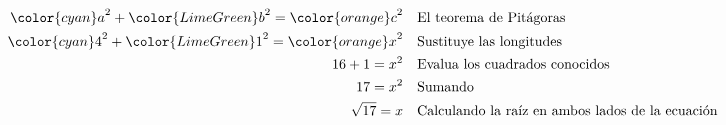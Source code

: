 \begin{minipage}[t][][t]{0.65\textwidth}
\begin{solutionbox}{10cm}
\begin{align*}
            {\color{cyan}a}^2+{\color{LimeGreen}b}^2  ={\color{orange}c}^2 & \text{\quad El teorema de Pitágoras}                          \\
            {\color{cyan}4}^2+{\color{LimeGreen}1}^2  ={\color{orange}x}^2 & \text{\quad Sustituye las longitudes}                         \\
            16+1   =x^2                                                    & \text{\quad Evalua los cuadrados conocidos}                   \\
            17=x^2                                                         & \text{\quad Sumando }                                         \\
            \sqrt{17}=x                                                    & \text{\quad Calculando la raíz en ambos lados de la ecuación} \\
        \end{align*}
    \end{solutionbox}
\end{minipage}
